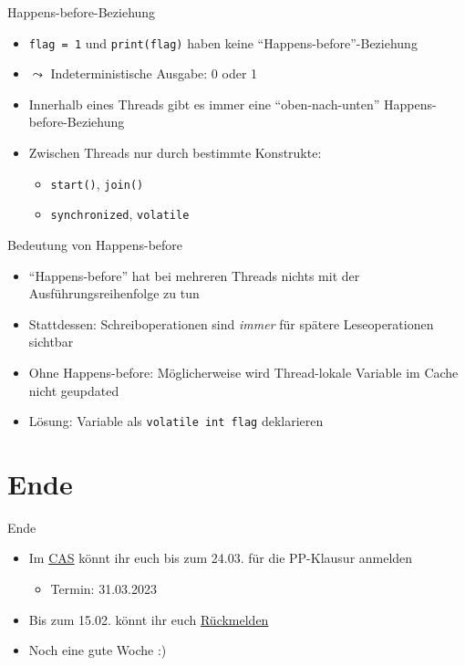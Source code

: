 \documentclass{beamer}
\newcommand{\code}[1]{
	\begin{mdframed}
		
	\end{mdframed}
}
\begin{document}
\begin{frame}{Happens-before-Beziehung}
  \code{code/happens-before.java}

  \begin{itemize}
    \item \texttt{flag = 1} und \texttt{print(flag)} haben keine \enquote{Happens-before}-Beziehung
    \item $\leadsto$ Indeterministische Ausgabe: 0 oder 1
    \item Innerhalb eines Threads gibt es immer eine \enquote{oben-nach-unten} Happens-before-Beziehung
    \item Zwischen Threads nur durch bestimmte Konstrukte:
    \begin{itemize}
      \item \texttt{start()}, \texttt{join()}
      \item \texttt{synchronized}, \texttt{volatile}
    \end{itemize}
  \end{itemize}
\end{frame}

\begin{frame}{Bedeutung von Happens-before}
  \code{code/happens-before2.java}

  {\small
  \begin{itemize}
    \item \enquote{Happens-before} hat bei mehreren Threads nichts mit der Ausführungsreihenfolge zu tun
    \item Stattdessen: Schreiboperationen sind \emph{immer} für spätere Leseoperationen sichtbar
    \item Ohne Happens-before: Möglicherweise wird Thread-lokale Variable im Cache nicht geupdated
    \item Lösung: Variable als \texttt{volatile int flag} deklarieren
  \end{itemize}
  }
\end{frame}

\section{Ende}

\begin{frame}{Ende}
	\begin{itemize}
		\item Im \href{https://campus.studium.kit.edu/exams/registration.php?pguid=0x87BA4E33FD4947E8ADAB43370BDFA852}{CAS} könnt ihr euch bis zum 24.03. für die PP-Klausur anmelden
		\begin{itemize}
			\item Termin: 31.03.2023
		\end{itemize}
		\item Bis zum 15.02. könnt ihr euch \href{https://campus.studium.kit.edu/renewal/payment.php}{Rückmelden}
		\item Noch eine gute Woche :)
	\end{itemize}
\end{frame}
\end{document}
